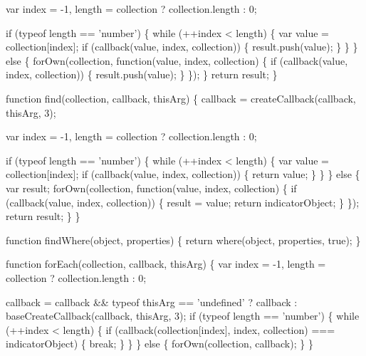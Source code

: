 \begin{DoxyCodeInclude}
{{    var index = -1,
        length = collection ? collection.length : 0;

    \textcolor{keywordflow}{if} (typeof length == \textcolor{stringliteral}{'number'}) \{
      \textcolor{keywordflow}{while} (++index < length) \{
        var value = collection[index];
        \textcolor{keywordflow}{if} (callback(value, index, collection)) \{
          result.push(value);
        \}
      \}
    \} \textcolor{keywordflow}{else} \{
      forOwn(collection, \textcolor{keyword}{function}(value, index, collection) \{
        \textcolor{keywordflow}{if} (callback(value, index, collection)) \{
          result.push(value);
        \}
      \});
    \}
    \textcolor{keywordflow}{return} result;
  \}

  \textcolor{keyword}{function} find(collection, callback, thisArg) \{
    callback = createCallback(callback, thisArg, 3);

    var index = -1,
        length = collection ? collection.length : 0;

    \textcolor{keywordflow}{if} (typeof length == \textcolor{stringliteral}{'number'}) \{
      \textcolor{keywordflow}{while} (++index < length) \{
        var value = collection[index];
        \textcolor{keywordflow}{if} (callback(value, index, collection)) \{
          \textcolor{keywordflow}{return} value;
        \}
      \}
    \} \textcolor{keywordflow}{else} \{
      var result;
      forOwn(collection, \textcolor{keyword}{function}(value, index, collection) \{
        \textcolor{keywordflow}{if} (callback(value, index, collection)) \{
          result = value;
          \textcolor{keywordflow}{return} indicatorObject;
        \}
      \});
      \textcolor{keywordflow}{return} result;
    \}
  \}

  \textcolor{keyword}{function} findWhere(\textcolor{keywordtype}{object}, properties) \{
    \textcolor{keywordflow}{return} where(\textcolor{keywordtype}{object}, properties, \textcolor{keyword}{true});
  \}

  \textcolor{keyword}{function} forEach(collection, callback, thisArg) \{
    var index = -1,
        length = collection ? collection.length : 0;

    callback = callback && typeof thisArg == \textcolor{stringliteral}{'undefined'} ? callback : baseCreateCallback(callback, thisArg,
       3);
    \textcolor{keywordflow}{if} (typeof length == \textcolor{stringliteral}{'number'}) \{
      \textcolor{keywordflow}{while} (++index < length) \{
        \textcolor{keywordflow}{if} (callback(collection[index], index, collection) === indicatorObject) \{
          \textcolor{keywordflow}{break};
        \}
      \}
    \} \textcolor{keywordflow}{else} \{
      forOwn(collection, callback);
    \}
  \}

}}
\end{DoxyCodeInclude}
